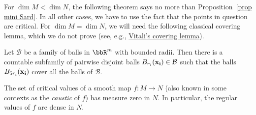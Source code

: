 For $\dim M<\dim N$, the following theorem says no more than Proposition~\ref{prop mini Sard}. In all other cases, we have to use the fact that the points in question are critical. For $\dim M=\dim N$, we will need the following classical covering lemma, which we do not prove (see, e.g., \href{https://en.wikipedia.org/wiki/Vitali_covering_lemma}{Vitali's covering lemma}).

\begin{lem}[Vitali]\label{lem Vitali}
    Let $\mathcal{B}$ be a family of balls in $\bbR^m$ with bounded radii. Then there is a countable subfamily of pairwise disjoint balls $B_{r_i}(\bf{x}_i)\in\mathcal{B}$ such that the balls $B_{5r_i}(\bf{x}_i)$ cover all the balls of $\mathcal{B}$.
\end{lem}

\begin{thm}\label{thm sard}
    The set of critical values of a smooth map $f:M\to N$ (also known in some contexts as the \emph{caustic} of $f$) has measure zero in $N$. In particular, the regular values of $f$ are dense in $N$.
\end{thm}
